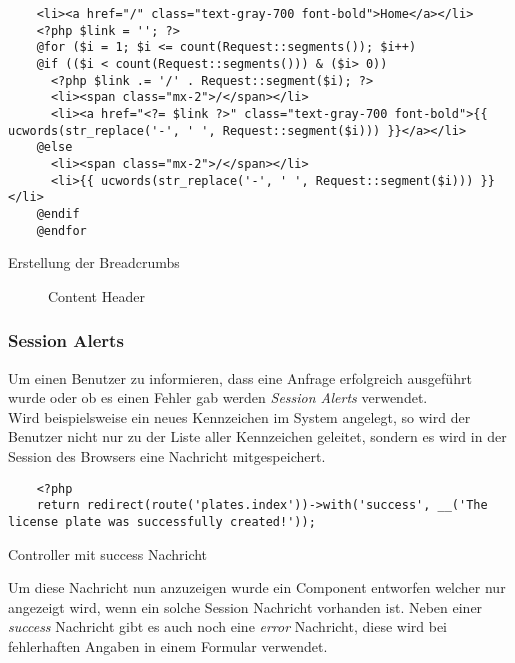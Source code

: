 \begin{listing}[H]
  \begin{verbatim}
    <li><a href="/" class="text-gray-700 font-bold">Home</a></li>
    <?php $link = ''; ?>
    @for ($i = 1; $i <= count(Request::segments()); $i++)
    @if (($i < count(Request::segments())) & ($i> 0))
      <?php $link .= '/' . Request::segment($i); ?>
      <li><span class="mx-2">/</span></li>
      <li><a href="<?= $link ?>" class="text-gray-700 font-bold">{{ ucwords(str_replace('-', ' ', Request::segment($i))) }}</a></li>
    @else 
      <li><span class="mx-2">/</span></li>
      <li>{{ ucwords(str_replace('-', ' ', Request::segment($i))) }}</li>
    @endif
    @endfor
  \end{verbatim}
  \caption{Erstellung der Breadcrumbs}
\end{listing}

\begin{figure}[H]
  \centering
  \caption{Content Header}
\end{figure}

\subsubsection{Session Alerts}
Um einen Benutzer zu informieren, dass eine Anfrage erfolgreich ausgeführt wurde
oder ob es einen Fehler gab werden \textit{Session Alerts} verwendet.\\

Wird beispielsweise ein neues Kennzeichen im System angelegt, so wird der
Benutzer nicht nur zu der Liste aller Kennzeichen geleitet, sondern es wird in
der Session des Browsers eine Nachricht mitgespeichert.

\begin{listing}[H]
  \begin{verbatim}
    <?php
    return redirect(route('plates.index'))->with('success', __('The license plate was successfully created!'));
  \end{verbatim}
  \caption{Controller mit success Nachricht}
\end{listing}

Um diese Nachricht nun anzuzeigen wurde ein Component entworfen welcher nur
angezeigt wird, wenn ein solche Session Nachricht vorhanden ist. Neben einer
\textit{success} Nachricht gibt es auch noch eine \textit{error} Nachricht,
diese wird bei fehlerhaften Angaben in einem Formular verwendet.

